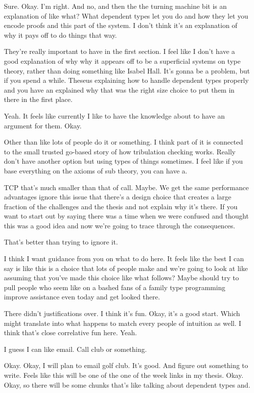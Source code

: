 \begin{subappendices}
Sure. Okay. I'm right. And no, and then the the turning machine bit is an explanation of like what? What dependent types let you do and how they let you encode proofs and this part of the system. I don't think it's an explanation of why it pays off to do things that way. 

They're really important to have in the first section. I feel like I don't have a good explanation of why why it appears off to be a superficial systems on type theory, rather than doing something like Isabel Hall. It's gonna be a problem, but if you spend a while. Theseus explaining how to handle dependent types properly and you have an explained why that was the right size choice to put them in there in the first place. 

Yeah. It feels like currently I like to have the knowledge about to have an argument for them. Okay. 

Other than like lots of people do it or something. I think part of it is connected to the small trusted go-based story of how tribulation checking works. Really don't have another option but using types of things sometimes. I feel like if you base everything on the axioms of sub theory, you can have a. 

TCP that's much smaller than that of call. Maybe. We get the same performance advantages ignore this issue that there's a design choice that creates a large fraction of the challenges and the thesis and not explain why it's there. If you want to start out by saying there was a time when we were confused and thought this was a good idea and now we're going to trace through the consequences. 

That's better than trying to ignore it. 

I think I want guidance from you on what to do here. It feels like the best I can say is like this is a choice that lots of people make and we're going to look at like assuming that you've made this choice like what follows? Maybe should try to pull people who seem like on a bashed fans of a family type programming improve assistance even today and get looked there. 

There didn't justifications over. I think it's fun. Okay, it's a good start. Which might translate into what happens to match every people of intuition as well. I think that's close correlative fun here. Yeah. 

I guess I can like email. Call club or something. 

Okay. Okay, I will plan to email golf club. It's good. And figure out something to write. Feels like this will be one of the one of the week links in my thesis. Okay. Okay, so there will be some chunks that's like talking about dependent types and. 


\end{subappendices}
